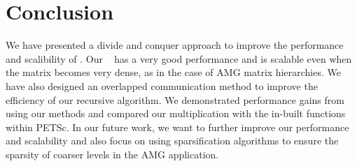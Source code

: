 \section{Conclusion}
\label{sec:conc}

We have presented a divide and conquer approach to improve the performance and scalibility of \mm. Our \mm~ has a very good performance and is scalable even when the matrix becomes very dense, as in the case of AMG matrix hierarchies. We have also designed an overlapped communication method to improve the efficiency of our recursive algorithm. We demonstrated performance gains from using our methods and compared our multiplication with the in-built functions within PETSc. In our future work, we want to further improve our performance and scalability and also focus on using sparsification algorithms to ensure the sparsity of coarser levels in the AMG application. 


